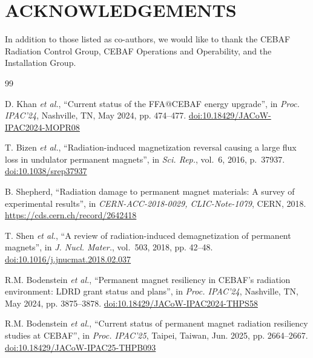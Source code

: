 \documentclass[a4paper,
               ]{jacow}
\begin{document}
\section{ACKNOWLEDGEMENTS}
In addition to those listed as co-authors, we would like to thank the CEBAF Radiation Control Group, CEBAF Operations and Operability, and the Installation Group.

%
%
    {\printbibliography}%
    {%

    \begin{thebibliography}{99}   %

            D. Khan \emph{et al.},
            ``Current status of the FFA@CEBAF energy upgrade'',
            in \emph{Proc. IPAC'24}, Nashville, TN, May 2024, pp. 474--477.
            \url{doi:10.18429/JACoW-IPAC2024-MOPR08}

            T. Bizen \emph{et al.},
            ``Radiation-induced magnetization reversal causing a large flux loss in undulator permanent magnets'',
            in \emph{Sci. Rep.}, vol.~6, 2016, p.~37937.
            \url{doi:10.1038/srep37937}

           B. Shepherd,
           ``Radiation damage to permanent magnet materials: A survey of experimental results'',
           in \emph{CERN-ACC-2018-0029, CLIC-Note-1079}, CERN, 2018.
           \url{https://cds.cern.ch/record/2642418}

            T. Shen \emph{et al.},
            ``A review of radiation-induced demagnetization of permanent magnets'',
            in \emph{J. Nucl. Mater.}, vol.~503, 2018, pp. 42--48.
            \url{doi:10.1016/j.jnucmat.2018.02.037}

            R.M. Bodenstein \emph{et al.},
            ``Permanent magnet resiliency in CEBAF's radiation environment: LDRD grant status and plans'',
            in \emph{Proc. IPAC'24}, Nashville, TN, May 2024, pp. 3875--3878.
            \url{doi:10.18429/JACoW-IPAC2024-THPS58}

             R.M. Bodenstein \emph{et al.},
            ``Current status of permanent magnet radiation resiliency studies at CEBAF'',
            in \emph{Proc. IPAC'25}, Taipei, Taiwan, Jun. 2025, pp. 2664--2667.
            \url{doi:10.18429/JACoW-IPAC25-THPB093}


\end{thebibliography}}
\end{document}
